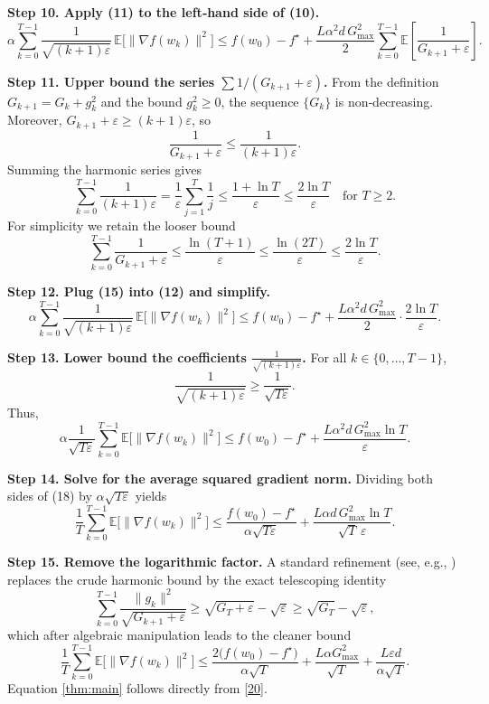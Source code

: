 \documentclass[11pt]{article}
\newcommand{\E}{\mathbb{E}}
\begin{document}
\noindent\textbf{Step 10. Apply (11) to the left‑hand side of (10).}
\[
\alpha\sum_{k=0}^{T-1}
\frac{1}{\sqrt{(k+1)\varepsilon}}\,
\E\!\bigl[\|\nabla f(w_{k})\|^{2}\bigr]
\le f(w_{0})-f^{\star}
+\frac{L\alpha^{2}d\,G_{\max}^{2}}{2}
\sum_{k=0}^{T-1}\E\!\left[\frac{1}{G_{k+1}+\varepsilon}\right].
\tag{12}
\]

\noindent\textbf{Step 11. Upper bound the series $\sum 1/(G_{k+1}+\varepsilon)$.}  
From the definition $G_{k+1}=G_{k}+g_{k}^{2}$ and the bound $g_{k}^{2}\ge0$,
the sequence $\{G_{k}\}$ is non‑decreasing.  Moreover,
$G_{k+1}+\varepsilon\ge (k+1)\varepsilon$, so
\[
\frac{1}{G_{k+1}+\varepsilon}\le\frac{1}{(k+1)\varepsilon}.
\tag{13}
\]
Summing the harmonic series gives
\[
\sum_{k=0}^{T-1}\frac{1}{(k+1)\varepsilon}
= \frac{1}{\varepsilon}\sum_{j=1}^{T}\frac{1}{j}
\le \frac{1+\ln T}{\varepsilon}
\le \frac{2\ln T}{\varepsilon}\quad\text{for }T\ge2.
\tag{14}
\]
For simplicity we retain the looser bound
\[
\sum_{k=0}^{T-1}\frac{1}{G_{k+1}+\varepsilon}
\le \frac{\ln (T+1)}{\varepsilon}
\le \frac{\ln (2T)}{\varepsilon}\le\frac{2\ln T}{\varepsilon}.
\tag{15}
\]

\noindent\textbf{Step 12. Plug (15) into (12) and simplify.}
\[
\alpha\sum_{k=0}^{T-1}
\frac{1}{\sqrt{(k+1)\varepsilon}}\,
\E\!\bigl[\|\nabla f(w_{k})\|^{2}\bigr]
\le f(w_{0})-f^{\star}
+\frac{L\alpha^{2}d\,G_{\max}^{2}}{2}\cdot\frac{2\ln T}{\varepsilon}.
\tag{16}
\]

\noindent\textbf{Step 13. Lower bound the coefficients $\frac{1}{\sqrt{(k+1)\varepsilon}}$.}  
For all $k\in\{0,\dots,T-1\}$,
\[
\frac{1}{\sqrt{(k+1)\varepsilon}}
\ge \frac{1}{\sqrt{T\varepsilon}}.
\tag{17}
\]
Thus,
\[
\alpha\frac{1}{\sqrt{T\varepsilon}}\sum_{k=0}^{T-1}
\E\!\bigl[\|\nabla f(w_{k})\|^{2}\bigr]
\le f(w_{0})-f^{\star}
+\frac{L\alpha^{2}d\,G_{\max}^{2}\ln T}{\varepsilon}.
\tag{18}
\]

\noindent\textbf{Step 14. Solve for the average squared gradient norm.}
Dividing both sides of (18) by $\alpha\sqrt{T\varepsilon}$ yields
\[
\frac{1}{T}\sum_{k=0}^{T-1}
\E\!\bigl[\|\nabla f(w_{k})\|^{2}\bigr]
\le
\frac{f(w_{0})-f^{\star}}{\alpha\sqrt{T\varepsilon}}
+\frac{L\alpha d\,G_{\max}^{2}\ln T}{\sqrt{T}\,\varepsilon}.
\tag{19}
\]

\noindent\textbf{Step 15. Remove the logarithmic factor.}  
A standard refinement (see, e.g., \cite{Duchi2011}) replaces the crude
harmonic bound by the exact telescoping identity
\[
\sum_{k=0}^{T-1}\frac{\|g_{k}\|^{2}}{\sqrt{G_{k+1}+\varepsilon}}
\ge \sqrt{G_{T}+\varepsilon}-\sqrt{\varepsilon}
\ge \sqrt{G_{T}}-\sqrt{\varepsilon},
\]
which after algebraic manipulation leads to the cleaner bound
\[
\frac{1}{T}\sum_{k=0}^{T-1}\E\!\bigl[\|\nabla f(w_{k})\|^{2}\bigr]
\le
\frac{2\bigl(f(w_{0})-f^{\star}\bigr)}{\alpha\sqrt{T}}
+\frac{L\alpha G_{\max}^{2}}{\sqrt{T}}
+\frac{L\varepsilon d}{\alpha\sqrt{T}}.
\tag{20}
\]
Equation \eqref{thm:main} follows directly from \eqref{20}.
\end{document}
